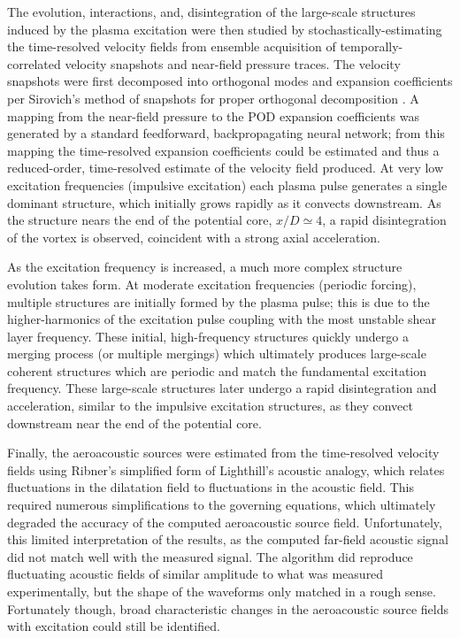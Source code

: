 The evolution, interactions, and, disintegration of the large-scale structures induced by the plasma excitation were then studied by stochastically-estimating the time-resolved velocity fields from ensemble acquisition of temporally-correlated velocity snapshots and near-field pressure traces.
The velocity snapshots were first decomposed into orthogonal modes and expansion coefficients per Sirovich's method of snapshots for proper orthogonal decomposition \citep{Sirovich1987}.
A mapping from the near-field pressure to the POD expansion coefficients was generated by a standard feedforward, backpropagating neural network; from this mapping the time-resolved expansion coefficients could be estimated and thus a reduced-order, time-resolved estimate of the velocity field produced.
At very low excitation frequencies (impulsive excitation) each plasma pulse generates a single dominant structure, which initially grows rapidly as it convects downstream. 
As the structure nears the end of the potential core, $x/D \simeq 4$, a rapid disintegration of the vortex is observed, coincident with a strong axial acceleration.

As the excitation frequency is increased, a much more complex structure evolution takes form.
At moderate excitation frequencies (periodic forcing), multiple structures are initially formed by the plasma pulse; this is due to the higher-harmonics of the excitation pulse coupling with the most unstable shear layer frequency.
These initial, high-frequency structures quickly undergo a merging process (or multiple mergings) which ultimately produces large-scale coherent structures which are periodic and match the fundamental excitation frequency.
These large-scale structures later undergo a rapid disintegration and acceleration, similar to the impulsive excitation structures, as they convect downstream near the end of the potential core. 

Finally, the aeroacoustic sources were estimated from the time-resolved velocity fields using Ribner's simplified form of Lighthill's acoustic analogy, which relates fluctuations in the dilatation field to fluctuations in the acoustic field.
This required numerous simplifications to the governing equations, which ultimately degraded the accuracy of the computed aeroacoustic source field.
Unfortunately, this limited interpretation of the results, as the computed far-field acoustic signal did not match well with the measured signal.
The algorithm did reproduce fluctuating acoustic fields of similar amplitude to what was measured experimentally, but the shape of the waveforms only matched in a rough sense.
Fortunately though, broad characteristic changes in the aeroacoustic source fields with excitation could still be identified.

